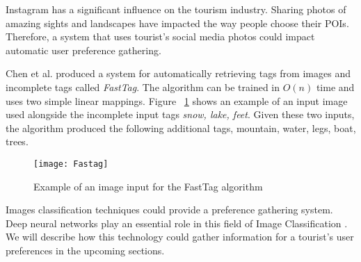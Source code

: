 Instagram has a significant influence on the tourism industry. Sharing photos
of amazing sights and landscapes have impacted the way people
choose their POIs\cite{Terttunen2017}. Therefore, a system that uses
tourist's social media photos could impact automatic user preference gathering. 

Chen et al.\cite{Chen2013} produced a system for automatically retrieving tags
from images and incomplete tags called \emph{FastTag}. The algorithm can be
trained in \(O(n)\) time and uses two simple linear mappings. Figure
~\ref{fasttag} shows an example of an input image used alongside the incomplete
input tags \emph{snow, lake, feet}. Given these two inputs, the algorithm
produced the following additional tags, {mountain, water, legs, boat, trees}.

\begin{figure}[h]
\centering
\texttt{[image: Fastag]}
\caption{Example of an image input for the FastTag algorithm}
\label{fasttag}
\end{figure}

Images classification techniques could provide a preference gathering system.
Deep neural networks play an essential role in this field of Image
Classification \cite{Balaji2019, Cufoglu}. We will describe how this technology
could gather information for a tourist's user preferences in the upcoming
sections.
